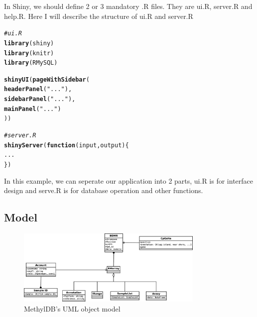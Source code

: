 \documentclass{article}\usepackage[]{graphicx}\usepackage[]{color}
\makeatletter
\newcommand{\hlstr}[1]{\textcolor[rgb]{0.192,0.494,0.8}{#1}}%
\newcommand{\hlcom}[1]{\textcolor[rgb]{0.678,0.584,0.686}{\textit{#1}}}%
\newcommand{\hlstd}[1]{\textcolor[rgb]{0.345,0.345,0.345}{#1}}%
\newcommand{\hlkwa}[1]{\textcolor[rgb]{0.161,0.373,0.58}{\textbf{#1}}}%
\newcommand{\hlkwc}[1]{\textcolor[rgb]{0.333,0.667,0.333}{#1}}%
\newcommand{\hlkwd}[1]{\textcolor[rgb]{0.737,0.353,0.396}{\textbf{#1}}}%
\newenvironment{kframe}{%
 \def\at@end@of@kframe{}%
 \ifinner\ifhmode%
  \def\at@end@of@kframe{\end{minipage}}%
  \begin{minipage}{\columnwidth}%
 \fi\fi%
 \def\FrameCommand##1{\hskip\@totalleftmargin \hskip-\fboxsep
 \colorbox{shadecolor}{##1}\hskip-\fboxsep
     \hskip-\linewidth \hskip-\@totalleftmargin \hskip\columnwidth}%
 \MakeFramed {\advance\hsize-\width
   \@totalleftmargin\z@ \linewidth\hsize
   \@setminipage}}%
 {\par\unskip\endMakeFramed%
 \at@end@of@kframe}
\newenvironment{knitrout}{}{} %
\makeatother
\begin{document}
In Shiny, we should define 2 or 3 mandatory .R files. They are ui.R, server.R and help.R. Here I will describe the structure of ui.R and server.R

\begin{knitrout}
\color{fgcolor}\begin{kframe}
\begin{alltt}
\hlcom{# ui.R}
\hlkwd{library}\hlstd{(shiny)}
\hlkwd{library}\hlstd{(knitr)}
\hlkwd{library}\hlstd{(RMySQL)}

\hlkwd{shinyUI}\hlstd{(}\hlkwd{pageWithSidebar}\hlstd{(}
    \hlkwd{headerPanel}\hlstd{(}\hlstr{"..."}\hlstd{),}
    \hlkwd{sidebarPanel}\hlstd{(}\hlstr{"..."}\hlstd{),}
    \hlkwd{mainPanel}\hlstd{(}\hlstr{"..."}\hlstd{)}
\hlstd{))}
\end{alltt}
\end{kframe}
\end{knitrout}

\begin{knitrout}
\color{fgcolor}\begin{kframe}
\begin{alltt}
\hlcom{# server.R}
\hlkwd{shinyServer}\hlstd{(}\hlkwa{function}\hlstd{(}\hlkwc{input}\hlstd{,} \hlkwc{output}\hlstd{) \{}
  \hlstd{...}
\hlstd{\})}
\end{alltt}
\end{kframe}
\end{knitrout}

In this example, we can seperate our application into 2 parts, ui.R is for interface design and serve.R is for database operation and other functions. 

\subsection{Model}
\begin{figure}
\centering
\includegraphics[width=0.8\textwidth]{MethylDB.eps}
\caption{MethylDB's UML object model}
\end{figure}
\end{document}
